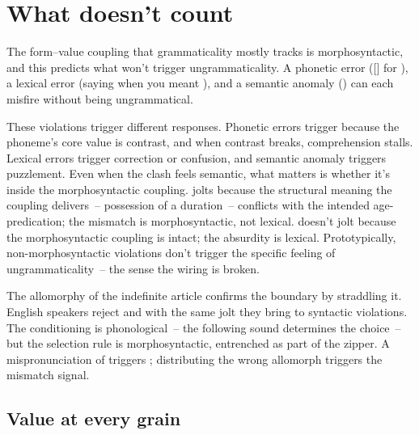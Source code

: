 \section{What doesn't count}
\label{sec:15:negative-space}

The form--value coupling that grammaticality mostly tracks is morphosyntactic, and this predicts what won't trigger ungrammaticality. A phonetic error ([] for ), a lexical error (saying  when you meant ), and a semantic anomaly () can each misfire without being ungrammatical.

These violations trigger different responses. Phonetic errors trigger  because the phoneme's core value is contrast, and when contrast breaks, comprehension stalls. Lexical errors trigger correction or confusion, and semantic anomaly triggers puzzlement. Even when the clash feels semantic, what matters is whether it's inside the morphosyntactic coupling. \ungram{} jolts because the structural meaning the coupling delivers~-- possession of a duration~-- conflicts with the intended age-predication; the mismatch is morphosyntactic, not lexical.  doesn't jolt because the morphosyntactic coupling is intact; the absurdity is lexical. Prototypically, non-morphosyntactic violations don't trigger the specific feeling of ungrammaticality~-- the sense the wiring is broken.

The allomorphy of the indefinite article confirms the boundary by straddling it. English speakers reject \ungram{} and \ungram{} with the same jolt they bring to syntactic violations. The conditioning is phonological~-- the following sound determines the choice~-- but the selection rule is morphosyntactic, entrenched as part of the zipper. A mispronunciation of  triggers ; distributing the wrong allomorph triggers the mismatch signal.

\subsection{Value at every grain}
\label{sec:15:value-every-grain}

